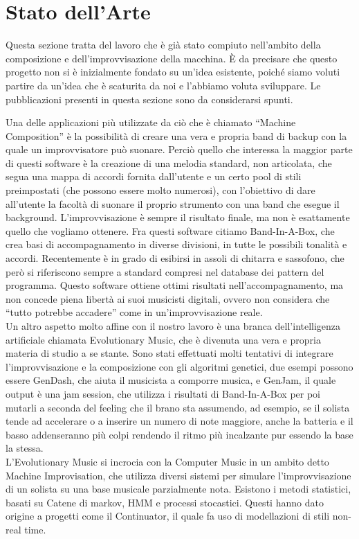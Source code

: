 \section{Stato dell'Arte}
Questa sezione tratta del lavoro che è già stato compiuto nell'ambito della composizione e dell'improvvisazione della macchina.
È da precisare che questo progetto non si è inizialmente fondato su un'idea esistente, poiché siamo voluti partire da un'idea che è scaturita da noi e l'abbiamo voluta sviluppare.
Le pubblicazioni presenti in questa sezione sono da considerarsi spunti.
\newline

Una delle applicazioni più utilizzate da ciò che è chiamato ``Machine Composition'' è la possibilità di creare una vera e propria band di backup con la quale un improvvisatore può suonare.
Perciò quello che interessa la maggior parte di questi software è la creazione di una melodia standard, non articolata, che segua una mappa di accordi fornita dall'utente e un certo pool di stili preimpostati (che possono essere molto numerosi), con l'obiettivo di dare all'utente la facoltà di suonare il proprio strumento con una band che esegue il background.
L'improvvisazione è sempre il risultato finale, ma non è esattamente quello che vogliamo ottenere.
Fra questi software citiamo Band-In-A-Box\cite{biab}, che crea basi di accompagnamento in diverse divisioni, in tutte le possibili tonalità e accordi.
Recentemente è in grado di esibirsi in assoli di chitarra e sassofono, che però si riferiscono sempre a standard compresi nel database dei pattern del programma.
Questo software ottiene ottimi risultati nell'accompagnamento, ma non concede piena libertà ai suoi musicisti digitali, ovvero non considera che ``tutto potrebbe accadere'' come in un'improvvisazione reale.
\\
Un altro aspetto molto affine con il nostro lavoro è una branca dell'intelligenza artificiale chiamata Evolutionary Music, che è divenuta una vera e propria materia di studio a se stante\cite{evomus}.
Sono stati effettuati molti tentativi di integrare l'improvvisazione e la composizione con gli algoritmi genetici, due esempi possono essere GenDash\cite{gendash}, che aiuta il musicista a comporre  musica, e GenJam\cite{genjam}, il quale output è una jam session, che utilizza i risultati di Band-In-A-Box per poi mutarli a seconda del feeling che il brano sta assumendo, ad esempio, se il solista tende ad accelerare o a inserire un numero di note maggiore, anche la batteria e il basso addenseranno più colpi rendendo il ritmo più incalzante pur essendo la base la stessa.
\\
L'Evolutionary Music si incrocia con la Computer Music in un ambito detto Machine Improvisation, che utilizza diversi sistemi per simulare l'improvvisazione di un solista su una base musicale parzialmente nota.
Esistono i metodi statistici, basati su Catene di markov, HMM e processi stocastici\cite{hmm}.
Questi hanno dato origine a progetti come il Continuator\cite{cont}, il quale fa uso di modellazioni di stili non-real time\cite{dubnov}.
\newline

